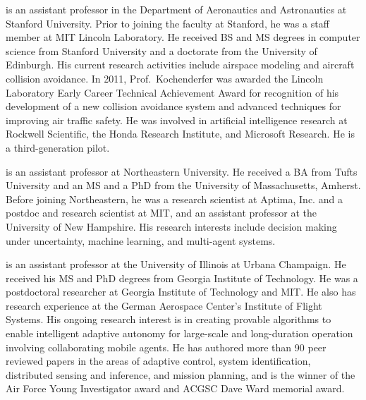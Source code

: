 \documentclass[dvipdfmx,uplatex,useotf]{dmubookJ}
\begin{document}
\begin{abouttheauthors}
 is an assistant professor in the Department of Aeronautics and Astronautics at Stanford University. Prior to joining the faculty at Stanford, he was a staff member at MIT Lincoln Laboratory. He received BS and MS degrees in computer science from Stanford University and a doctorate from the University of Edinburgh. His current research activities include airspace modeling and aircraft collision avoidance. In 2011, Prof.~Kochenderfer was awarded the Lincoln Laboratory Early Career Technical Achievement Award for recognition
of his development of a new collision avoidance system and advanced techniques for improving air traffic safety. He was involved in artificial intelligence research at Rockwell Scientific, the Honda Research Institute, and Microsoft Research. He is a third-generation pilot.

 is an assistant professor at Northeastern University. He received a BA from Tufts University and an MS and a PhD from the University of Massachusetts, Amherst. Before joining Northeastern, he was a research scientist at Aptima, Inc. and a postdoc and research scientist at MIT, and an assistant professor at the University of New Hampshire. His research interests include decision making under uncertainty, machine learning, and multi-agent systems. 

  is an assistant professor at the University of Illinois at Urbana Champaign. He received his MS and PhD degrees from Georgia Institute of Technology. He was a postdoctoral researcher at Georgia Institute of Technology and MIT. He also has research experience at the German Aerospace Center's Institute of Flight Systems. His ongoing research interest is in creating provable algorithms to enable intelligent adaptive autonomy for large-scale and long-duration operation involving collaborating mobile agents. He has authored more than 90 peer reviewed papers in the areas of adaptive control, system identification, distributed sensing and inference, and mission planning, and is the winner of the Air Force Young Investigator award and ACGSC Dave Ward memorial award.



\end{abouttheauthors}
\end{document}
